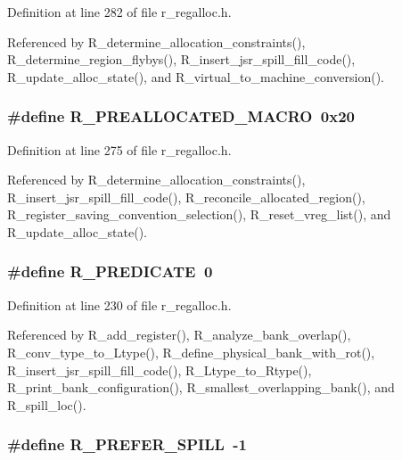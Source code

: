 Definition at line 282 of file r\_\-regalloc.h.

Referenced by R\_\-determine\_\-allocation\_\-constraints(), R\_\-determine\_\-region\_\-flybys(), R\_\-insert\_\-jsr\_\-spill\_\-fill\_\-code(), R\_\-update\_\-alloc\_\-state(), and R\_\-virtual\_\-to\_\-machine\_\-conversion().
\subsubsection{\setlength{\rightskip}{0pt plus 5cm}\#define R\_\-PREALLOCATED\_\-MACRO~0x20}\label{r__regalloc_8h_4ecf35dfd6b7766a10185123be87429a}




Definition at line 275 of file r\_\-regalloc.h.

Referenced by R\_\-determine\_\-allocation\_\-constraints(), R\_\-insert\_\-jsr\_\-spill\_\-fill\_\-code(), R\_\-reconcile\_\-allocated\_\-region(), R\_\-register\_\-saving\_\-convention\_\-selection(), R\_\-reset\_\-vreg\_\-list(), and R\_\-update\_\-alloc\_\-state().
\subsubsection{\setlength{\rightskip}{0pt plus 5cm}\#define R\_\-PREDICATE~0}\label{r__regalloc_8h_5fe067a23b05f3bc547b85a04c26acda}




Definition at line 230 of file r\_\-regalloc.h.

Referenced by R\_\-add\_\-register(), R\_\-analyze\_\-bank\_\-overlap(), R\_\-conv\_\-type\_\-to\_\-Ltype(), R\_\-define\_\-physical\_\-bank\_\-with\_\-rot(), R\_\-insert\_\-jsr\_\-spill\_\-fill\_\-code(), R\_\-Ltype\_\-to\_\-Rtype(), R\_\-print\_\-bank\_\-configuration(), R\_\-smallest\_\-overlapping\_\-bank(), and R\_\-spill\_\-loc().
\subsubsection{\setlength{\rightskip}{0pt plus 5cm}\#define R\_\-PREFER\_\-SPILL~-1}\label{r__regalloc_8h_960db348dbea6b1656db26d15b11fd72}





